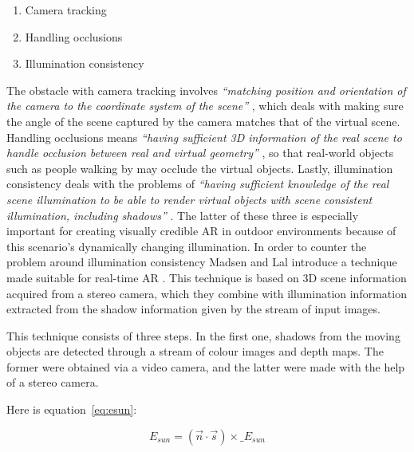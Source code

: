 \begin{enumerate}
\item Camera tracking 
\item Handling occlusions
\item Illumination consistency
\end{enumerate}

The obstacle with camera tracking involves \textit{“matching position and orientation of the camera to the coordinate system of the scene”} \cite{Lal2010}, which deals with making sure the angle of the scene captured by the camera matches that of the virtual scene. Handling occlusions means \textit{“having sufficient 3D information of the real scene to handle occlusion between real and virtual geometry”} \cite{Lal2010}, so that real-world objects such as people walking by may occlude the virtual objects. Lastly, illumination consistency deals with the problems of \textit{“having sufficient knowledge of the real scene illumination to be able to render virtual objects with scene consistent illumination, including shadows”} \cite{Lal2010}. The latter of these three is especially important for creating visually credible AR in outdoor environments because of this scenario’s dynamically changing illumination. In order to counter the problem around illumination consistency Madsen and Lal introduce a technique made suitable for real-time AR \cite{Lal2010}. This technique is based on 3D scene information acquired from a stereo camera, which they combine with illumination information extracted from the shadow information given by the stream of input images.

This technique consists of three steps. In the first one, shadows from the moving objects are detected through a stream of colour images and depth maps. The former were obtained via a video camera, and the latter were made with the help of a stereo camera.

Here is equation~\eqref{eq:esun}:

\begin{equation}
\label{eq:esun}
E_{sun} = (\vec{n} \cdot \vec{s}) \times \_E_{sun}
\end{equation}